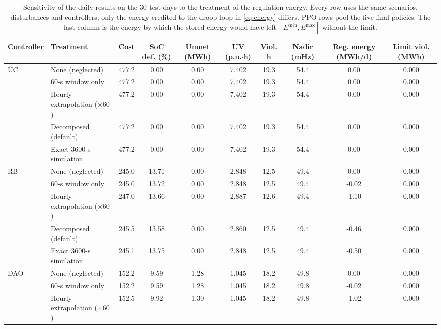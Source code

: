 \begin{table}[!t]
\caption{Sensitivity of the daily results on the 30 test days to the treatment of the regulation energy. Every row uses the same scenarios, disturbances and controllers; only the energy credited to the droop loop in \eqref{eq:energy} differs. PPO rows pool the five final policies. The last column is the energy by which the stored energy would have left $[E^{\min},E^{\max}]$ without the limit.}
\label{tab:modes}
\centering
\scriptsize
\setlength{\tabcolsep}{3pt}
\begin{tabular}{llcccccccc}
\toprule
\textbf{Controller} & \textbf{Treatment} & \textbf{Cost} & \textbf{SoC def. (\%)} & \textbf{Unmet (MWh)} & \textbf{UV (p.u.$\cdot$h)} & \textbf{Viol. h} & \textbf{Nadir (mHz)} & \textbf{Reg. energy (MWh/d)} & \textbf{Limit viol. (MWh)}\\
\midrule
\multirow{5}{*}{UC} & None (neglected) & 477.2 & 0.00 & 0.00 & 7.402 & 19.3 & 54.4 & 0.00 & 0.000 \\
& 60-s window only & 477.2 & 0.00 & 0.00 & 7.402 & 19.3 & 54.4 & 0.00 & 0.000 \\
& Hourly extrapolation ($\times 60$) & 477.2 & 0.00 & 0.00 & 7.402 & 19.3 & 54.4 & 0.00 & 0.000 \\
& Decomposed (default) & 477.2 & 0.00 & 0.00 & 7.402 & 19.3 & 54.4 & 0.00 & 0.000 \\
& Exact 3600-s simulation & 477.2 & 0.00 & 0.00 & 7.402 & 19.3 & 54.4 & 0.00 & 0.000 \\
\midrule
\multirow{5}{*}{RB} & None (neglected) & 245.0 & 13.71 & 0.00 & 2.848 & 12.5 & 49.4 & 0.00 & 0.000 \\
& 60-s window only & 245.0 & 13.72 & 0.00 & 2.848 & 12.5 & 49.4 & -0.02 & 0.000 \\
& Hourly extrapolation ($\times 60$) & 247.0 & 13.66 & 0.00 & 2.887 & 12.6 & 49.4 & -1.10 & 0.000 \\
& Decomposed (default) & 245.5 & 13.58 & 0.00 & 2.860 & 12.5 & 49.4 & -0.46 & 0.000 \\
& Exact 3600-s simulation & 245.1 & 13.75 & 0.00 & 2.848 & 12.5 & 49.4 & -0.50 & 0.000 \\
\midrule
\multirow{5}{*}{DAO} & None (neglected) & 152.2 & 9.59 & 1.28 & 1.045 & 18.2 & 49.8 & 0.00 & 0.000 \\
& 60-s window only & 152.2 & 9.59 & 1.28 & 1.045 & 18.2 & 49.8 & -0.02 & 0.000 \\
& Hourly extrapolation ($\times 60$) & 152.5 & 9.92 & 1.30 & 1.045 & 18.2 & 49.8 & -1.02 & 0.000 \\

\end{tabular}
\end{table}
